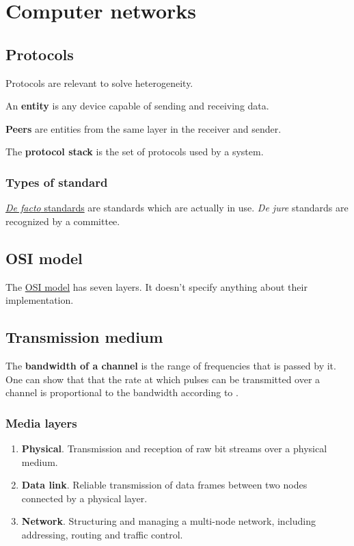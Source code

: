 \chapter{Computer networks}

\section{Protocols}

Protocols are relevant to solve heterogeneity.

An \textbf{entity} is any device capable of sending and receiving data.

\textbf{Peers} are entities from the same layer in the receiver and sender.

The \textbf{protocol stack} is the set of protocols used by a system.

\subsection{Types of standard}

\href{https://en.wikipedia.org/wiki/De_facto_standard}{\emph{De facto}
standards} are standards which are actually in use. \emph{De jure}
standards are recognized by a committee.

\section{OSI model}

The \href{https://en.wikipedia.org/wiki/OSI_model}{OSI model} has seven layers. It doesn't specify anything about their implementation.

\section{Transmission medium}

The \textbf{bandwidth of a channel} is the range of frequencies that is passed by it.
One can show that that the rate at which pulses can be transmitted over a channel is proportional to the bandwidth according to \cite{communication-networks-leon-garcia-2000}.

\subsection{Media layers}

\begin{enumerate}
\item \textbf{Physical}. Transmission and reception of raw bit streams over a physical medium.
\item \textbf{Data link}. Reliable transmission of data frames between two nodes connected by a physical layer.
\item \textbf{Network}. Structuring and managing a multi-node network, including addressing, routing and traffic control.
\end{enumerate}

